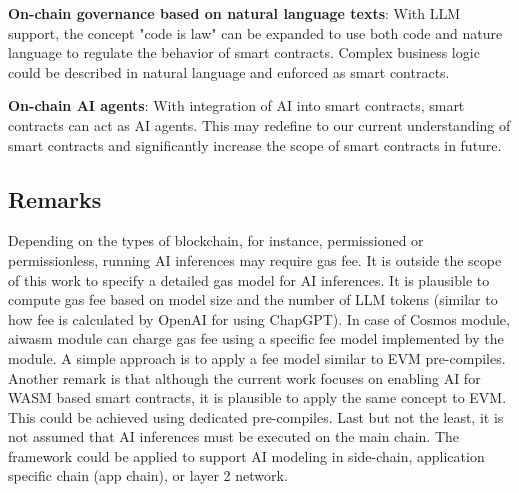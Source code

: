 \textbf{On-chain governance based on natural language texts}: With LLM support, the concept "code is law" can be expanded to use both code and nature language to regulate the behavior of smart contracts. Complex business logic could be described in natural language and enforced as smart contracts. 

\textbf{On-chain AI agents}: With integration of AI into smart contracts, smart contracts can act as AI agents. This may redefine to our current understanding of smart contracts and significantly increase the scope of smart contracts in future. 



\subsection{Remarks}

Depending on the types of blockchain, for instance, permissioned or permissionless, running AI inferences may require gas fee. It is outside the scope of this work to specify a detailed gas model for AI inferences. It is plausible to compute gas fee based on model size and the number of LLM tokens (similar to how fee is calculated by OpenAI for using ChapGPT).  In case of Cosmos module, aiwasm module can charge gas fee using a specific fee model implemented by the module. A simple approach is to apply a fee model similar to EVM pre-compiles. Another remark is that although the current work focuses on enabling AI for WASM based smart contracts, it is plausible to apply the same concept to EVM. This could be achieved using dedicated pre-compiles. Last but not the least, it is not assumed that AI inferences must be executed on the main chain. The framework could be applied to support AI modeling in side-chain, application specific chain (app chain), or layer 2 network.

